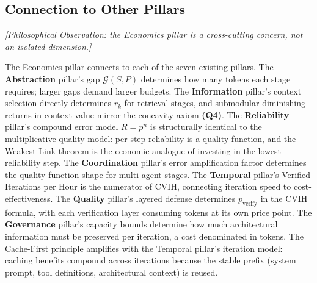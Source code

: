 \subsection{Connection to Other Pillars}

\emph{[Philosophical Observation: the Economics pillar is a cross-cutting concern, not an isolated dimension.]}

The Economics pillar connects to each of the seven existing pillars. The \textbf{Abstraction} pillar's gap $\mathcal{G}(S,P)$ determines how many tokens each stage requires; larger gaps demand larger budgets. The \textbf{Information} pillar's context selection directly determines $r_k$ for retrieval stages, and submodular diminishing returns in context value mirror the concavity axiom \textbf{(Q4)}. The \textbf{Reliability} pillar's compound error model $R = p^n$ is structurally identical to the multiplicative quality model: per-step reliability is a quality function, and the Weakest-Link theorem is the economic analogue of investing in the lowest-reliability step. The \textbf{Coordination} pillar's error amplification factor determines the quality function shape for multi-agent stages. The \textbf{Temporal} pillar's Verified Iterations per Hour is the numerator of CVIH, connecting iteration speed to cost-effectiveness. The \textbf{Quality} pillar's layered defense determines $p_{\text{verify}}$ in the CVIH formula, with each verification layer consuming tokens at its own price point. The \textbf{Governance} pillar's capacity bounds determine how much architectural information must be preserved per iteration, a cost denominated in tokens. The Cache-First principle amplifies with the Temporal pillar's iteration model: caching benefits compound across iterations because the stable prefix (system prompt, tool definitions, architectural context) is reused.
